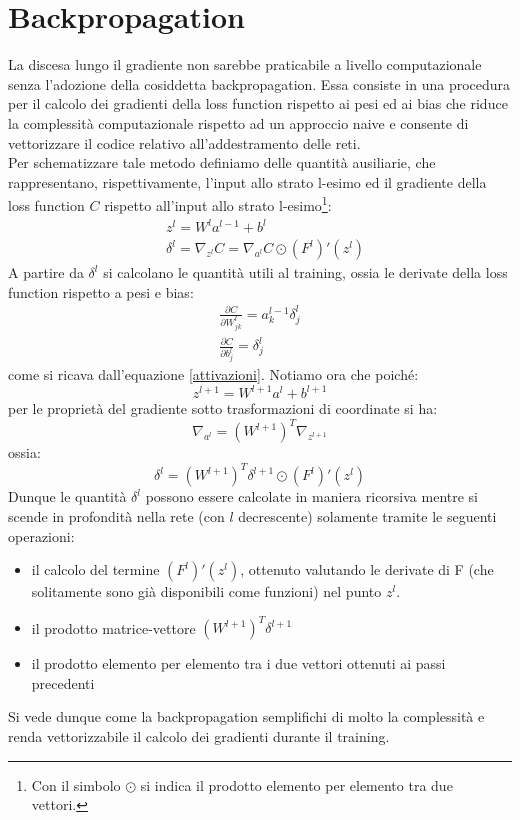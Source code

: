 \documentclass[Lau, noexaminfo, oneside]{sapthesis} %
\begin{document}
\section{Backpropagation} 
La discesa lungo il gradiente non sarebbe praticabile a livello computazionale senza l'adozione della cosiddetta backpropagation. Essa consiste in una procedura per il calcolo dei gradienti della loss function rispetto ai pesi ed ai bias che riduce la complessità computazionale rispetto ad un approccio naive e consente di vettorizzare il codice relativo all'addestramento delle reti.\\
Per schematizzare tale metodo definiamo delle quantità ausiliarie, che rappresentano, rispettivamente, l'input allo strato l-esimo ed il gradiente della loss function $C$ rispetto all'input allo strato l-esimo\footnote{Con il simbolo $\odot$ si indica il prodotto elemento per elemento tra due vettori.}:
\begin{align}
&z^l = W^l a^{l-1} + b^l \\
&\delta^l = \nabla_{z^l} C = \nabla_{a^l} C \odot (F^l)'(z^l)
\end{align}
A partire da $\delta^l$ si calcolano le quantità utili al training, ossia le derivate della loss function rispetto a pesi e bias:
\begin{align}
\frac{\partial C}{\partial W_{jk}^l} = a_k^{l-1} \delta_j^l\\
\frac{\partial C}{\partial b^l_j} = \delta_j^l
\end{align}
come si ricava dall'equazione \eqref{attivazioni}.
Notiamo ora che poiché:
\begin{equation}
z^{l+1} = W^{l+1} a^l+b^{l+1}
\end{equation}
per le proprietà del gradiente sotto trasformazioni di coordinate si ha:
\begin{equation}
\nabla_{a^l} = (W^{l+1})^T \nabla_{z^{l+1}} 
\end{equation}
ossia:
\begin{equation}
\delta^l =(W^{l+1})^T \delta^{l+1} \odot (F^l)'(z^l)
\end{equation}
Dunque le quantità $\delta^l$ possono essere calcolate in maniera ricorsiva mentre si scende in profondità nella rete (con $l$ decrescente) solamente tramite le seguenti operazioni:
\begin{itemize}
\item il calcolo del termine $(F^l)'(z^l)$, ottenuto valutando le derivate di F (che solitamente sono già disponibili come funzioni) nel punto $z^l$.
\item il prodotto matrice-vettore $(W^{l+1})^T \delta^{l+1}$
\item il prodotto elemento per elemento tra i due vettori ottenuti ai passi precedenti
\end{itemize}
Si vede dunque come la backpropagation semplifichi di molto la complessità e renda vettorizzabile il calcolo dei gradienti durante il training.\cite{nielsenneural}
\end{document}

